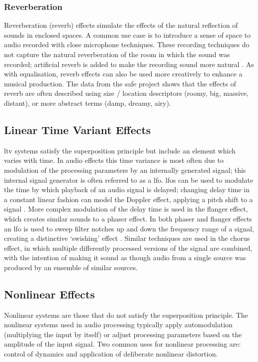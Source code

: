 		\subsubsection*{Reverberation}
			Reverberation (reverb) effects simulate the effects of the natural reflection of sounds in enclosed
			spaces. A common use case is to introduce a sense of space to audio recorded with close microphone
			techniques. These recording techniques do not capture the natural reverberation of the room in
			which the sound was recorded; artificial reverb is added to make the recording sound more natural
			\citep{gottlieb2007shaping}. As with equalisation, reverb effects can also be used more creatively
			to enhance a musical production. The data from the \acrshort{safe} project shows that the effects
			of reverb are often described using size / location descriptors (roomy, big, massive, distant), or
			more abstract terms (damp, dreamy, airy).

	\subsection{Linear Time Variant Effects}
	\label{sec:Timbre-AudioProcessing-LTV}
		\acrshort{ltv} systems satisfy the superposition principle but include an element which varies with time.
		In audio effects this time variance is most often due to modulation of the processing parameters by an
		internally generated signal; this internal signal generator is often referred to as a \acrfull{lfo}.
		\acrshort{lfo}s can be used to modulate the time by which playback of an audio signal is delayed; changing
		delay time in a constant linear fashion can model the Doppler effect, applying a pitch shift to a signal
		\citep{dattorro1997effect}. More complex modulation of the delay time is used in the flanger effect, which
		creates similar sounds to a phaser effect. In both phaser and flanger effects an \acrshort{lfo} is used to
		sweep filter notches up and down the frequency range of a signal, creating a distinctive `swishing'
		effect \citep{huber2010modern}. Similar techniques are used in the chorus effect, in which multiple
		differently processed versions of the signal are combined, with the intention of making it sound as
		though audio from a single source was produced by an ensemble of similar sources.

	\subsection{Nonlinear Effects}
	\label{sec:Timbre-AudioProcessing-Nonlinear}
		Nonlinear systems are those that do not satisfy the superposition principle. The nonlinear systems used in
		audio processing typically apply automodulation (multiplying the input by itself) or adjust processing
		parameters based on the amplitude of the input signal. Two common uses for nonlinear processing are:
		control of dynamics and application of deliberate nonlinear distortion.

